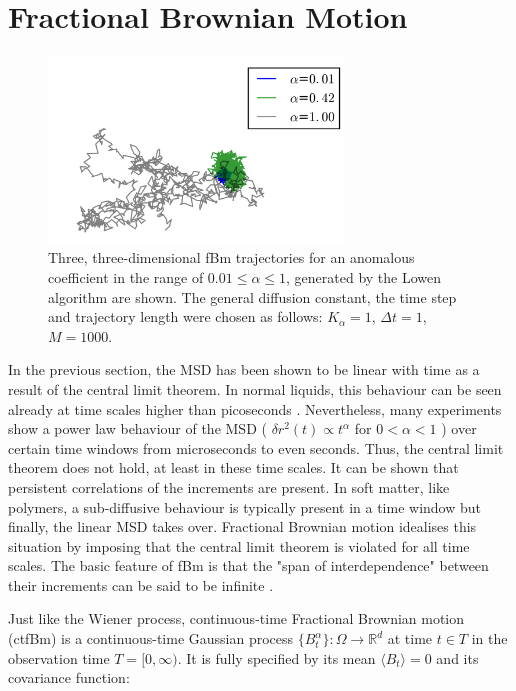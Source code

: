 \documentclass[
  a4paper,BCOR10mm,twoside,
  headsepline,footsepline,%
  fleqn,openbib
]{scrbook}
\begin{document}
\section{Fractional Brownian Motion}\label{sectionfrac}
\begin{figure}
\centering
\includegraphics[width=0.7\textwidth]{./data/trajectories_differentalpha1234.png}
\caption{Three, three-dimensional fBm trajectories for an anomalous coefficient in the range of $0.01\leq\alpha\leq 1$, generated by the Lowen algorithm are shown. The general diffusion constant, the time step and trajectory length were chosen as follows:  $K_{\alpha}=1$, $\Delta t=1$, $M=1000$.}
\label{alphachangetrajectory}
\end{figure}
In the previous section, the MSD has been shown to be linear with time as a result of the central limit theorem. In normal liquids, this behaviour can be seen already at time scales higher than picoseconds \cite{Hofling2013}. Nevertheless, many experiments show a power law behaviour of the MSD ( $\delta r ^2 (t) \propto t^{\alpha}$ for  $0 < \alpha < 1$ ) over certain time windows from  microseconds to even seconds. Thus, the central limit theorem does not hold, at least in these time scales. It can be shown that persistent correlations of the increments are present. In soft matter, like polymers, a sub-diffusive behaviour is typically present in a time window but finally, the linear MSD takes over. Fractional Brownian motion idealises this situation by imposing that the central limit theorem is violated for all time scales. The basic feature of fBm is that the "span of interdependence" between their increments can be said to be infinite \cite{Mandelbrot1968}. \par
Just like the Wiener process, continuous-time Fractional Brownian motion (ctfBm) is a continuous-time Gaussian process $\{B^{\alpha}_t\}: \Omega \rightarrow \mathbb{R}^d$ at time $t \in T$ in the observation time $T =[0, \infty)$. It is fully specified by its mean $\langle B_t \rangle=0$ and its covariance function:
\end{document}
